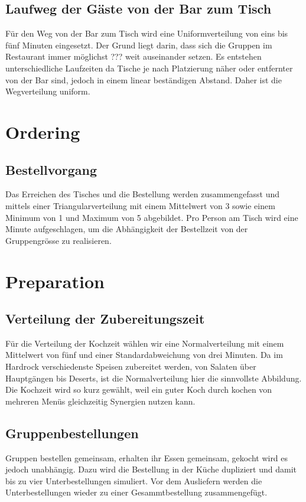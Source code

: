 \documentclass[ngerman,a4paper,12pt]{scrreprt}
\begin{document}
	
		\subsection{Laufweg der Gäste von der Bar zum Tisch}
			Für den Weg von der Bar zum Tisch wird eine Uniformverteilung von eins bis fünf Minuten eingesetzt. Der Grund liegt darin, dass sich die Gruppen im Restaurant immer möglichst ??? weit auseinander setzen. Es entstehen unterschiedliche Laufzeiten da Tische je nach Platzierung näher oder entfernter von der Bar sind, jedoch in einem linear beständigen Abstand. Daher ist die Wegverteilung uniform.
	
	
	\section{Ordering}			
		\subsection{Bestellvorgang}
			Das Erreichen des Tisches und die Bestellung werden zusammengefasst und mittels einer Triangularverteilung mit einem Mittelwert von 3 sowie einem Minimum von 1 und Maximum von 5 abgebildet. Pro Person am Tisch wird eine Minute aufgeschlagen, um die Abhängigkeit der Bestellzeit von der Gruppengrösse zu realisieren.
	
	
	\section{Preparation}	
		\subsection{Verteilung der Zubereitungszeit}
			Für die Verteilung der Kochzeit wählen wir eine Normalverteilung mit einem Mittelwert von fünf und einer Standardabweichung von drei Minuten. Da im Hardrock verschiedenste Speisen zubereitet werden, von Salaten über Hauptgängen bis Deserts, ist die Normalverteilung hier die sinnvollste Abbildung. Die Kochzeit wird so kurz gewählt, weil ein guter Koch durch kochen von mehreren Menüs gleichzeitig Synergien nutzen kann.
	
	
		\subsection{Gruppenbestellungen}
			Gruppen bestellen gemeinsam, erhalten ihr Essen gemeinsam, gekocht wird es jedoch unabhängig. Dazu wird die Bestellung in der Küche dupliziert und damit bis zu vier Unterbestellungen simuliert. Vor dem Ausliefern werden die Unterbestellungen wieder zu einer Gesammtbestellung zusammengefügt.
			
\end{document}
